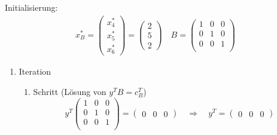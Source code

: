 \documentclass[a4paper]{scrartcl}
\begin{document}
\begin{enumerate}[label=\bfseries\arabic*.]
\begin{enumerate}
                Initialisierung:
                \begin{gather}
                    x_B^* =
                    \begin{pmatrix}
                        x_4^* \\ x_5^* \\ x_6^*
                    \end{pmatrix}
                    =
                    \begin{pmatrix}
                        2 \\ 5 \\ 2
                    \end{pmatrix}
                    \quad
                    B =
                    \begin{pmatrix}
                        1 & 0 & 0 \\
                        0 & 1 & 0 \\
                        0 & 0 & 1 \\
                    \end{pmatrix}
                \end{gather}

                \begin{enumerate}[1.]
                    \item Iteration
                        \begin{enumerate}[1.]
                            \item Schritt (Lösung von $y^TB = c_B^T$)
                                \begin{equation}
                                    y^T
                                    \begin{pmatrix}
                                        1 & 0 & 0 \\
                                        0 & 1 & 0 \\
                                        0 & 0 & 1 \\
                                    \end{pmatrix}
                                    =
                                    \begin{pmatrix}
                                        0 & 0 & 0
                                    \end{pmatrix}
                                    \quad\Rightarrow\quad
                                    y^T =
                                    \begin{pmatrix}
                                        0 & 0 & 0
                                    \end{pmatrix}
                                \end{equation}
                                

\end{enumerate}
\end{enumerate}
\end{enumerate}
\end{enumerate}
\end{document}
